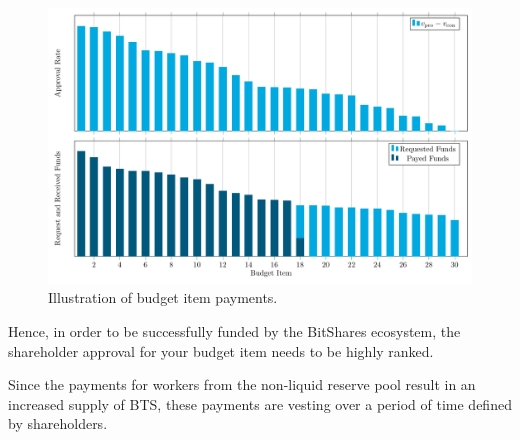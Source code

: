 \begin{figure}[!htp]
 \centering
  \includegraphics[width=\linewidth]{figures/worker-pay-algo.pdf}\vspace*{-2ex}
 \caption{Illustration of budget item payments.}
 \label{fig:workerpayalgo}
\end{figure}
Hence, in order to be successfully funded by the BitShares ecosystem, the
shareholder approval for your budget item needs to be highly ranked.

Since the payments for workers from the non-liquid reserve pool result in an
increased supply of BTS, these payments are vesting over a period of time
defined by shareholders.
